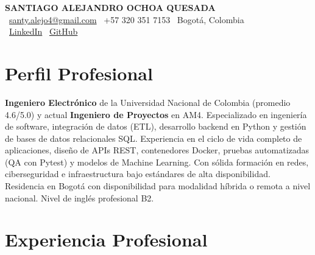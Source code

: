 \documentclass[11pt,a4paper]{article}
\begin{document}
\thispagestyle{empty}
\color{darktext}

\begin{center}
    {\Huge \bfseries\color{accent} SANTIAGO ALEJANDRO OCHOA QUESADA} \\[6pt]
    {\small\color{darktext}
    \faEnvelope\ \href{mailto:santy.alejo4@gmail.com}{santy.alejo4@gmail.com}
    \quad\textcolor{bulletline}{\textbar}\quad
    \faPhone\ +57 320 351 7153
    \quad\textcolor{bulletline}{\textbar}\quad
    \faMapMarker*\ Bogotá, Colombia \\[4pt]
    \faLinkedin\ \href{https://linkedin.com/in/santiago-alejandro-ochoa-quesada-a07a18288/}{LinkedIn}
    \quad\textcolor{bulletline}{\textbar}\quad
    \faGithub\ \href{https://github.com/Sochoaq}{GitHub}
    }
\end{center}
\vspace{4pt}

\section{Perfil Profesional}
\textbf{Ingeniero Electrónico} de la Universidad Nacional de Colombia (promedio 4.6/5.0) y actual \textbf{Ingeniero de Proyectos} en AM4. Especializado en ingeniería de software, integración de datos (ETL), desarrollo backend en Python y gestión de bases de datos relacionales SQL. Experiencia en el ciclo de vida completo de aplicaciones, diseño de APIs REST, contenedores Docker, pruebas automatizadas (QA con Pytest) y modelos de Machine Learning. Con sólida formación en redes, ciberseguridad e infraestructura bajo estándares de alta disponibilidad. Residencia en Bogotá con disponibilidad para modalidad híbrida o remota a nivel nacional. Nivel de inglés profesional B2.

\section{Experiencia Profesional}
\end{document}
